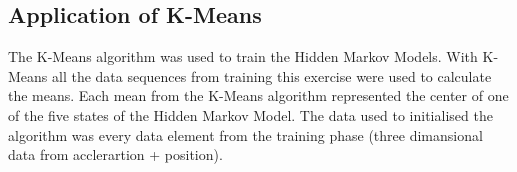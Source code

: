\subsection{Application of K-Means}
The K-Means algorithm was used to train the Hidden Markov Models. With K-Means all the data sequences from training this exercise were used to calculate the means. Each mean from the K-Means algorithm represented the center of one of the five states of the Hidden Markov Model. The data used to initialised the algorithm was every data element from the training phase (three dimansional data from acclerartion + position).  
